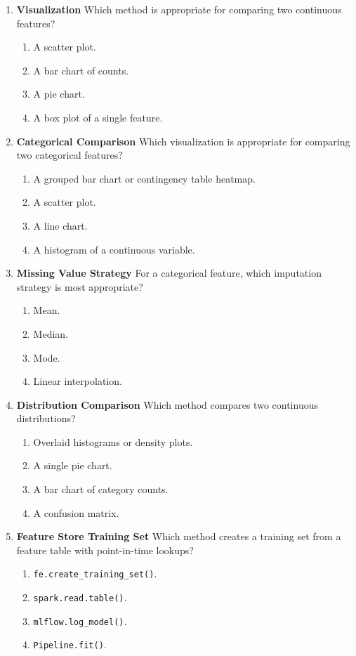 \documentclass{article}
\begin{document}
\begin{enumerate}[label=\textbf{Q\arabic*.}]
		\item \textbf{Visualization}
		Which method is appropriate for comparing two continuous features?
		\begin{enumerate}[label=\Alph*.]
			\item A scatter plot.
			\item A bar chart of counts.
			\item A pie chart.
			\item A box plot of a single feature.
		\end{enumerate}
		
		\item \textbf{Categorical Comparison}
		Which visualization is appropriate for comparing two categorical features?
		\begin{enumerate}[label=\Alph*.]
			\item A grouped bar chart or contingency table heatmap.
			\item A scatter plot.
			\item A line chart.
			\item A histogram of a continuous variable.
		\end{enumerate}
		
		\item \textbf{Missing Value Strategy}
		For a categorical feature, which imputation strategy is most appropriate?
		\begin{enumerate}[label=\Alph*.]
			\item Mean.
			\item Median.
			\item Mode.
			\item Linear interpolation.
		\end{enumerate}
		
		\item \textbf{Distribution Comparison}
		Which method compares two continuous distributions?
		\begin{enumerate}[label=\Alph*.]
			\item Overlaid histograms or density plots.
			\item A single pie chart.
			\item A bar chart of category counts.
			\item A confusion matrix.
		\end{enumerate}
		
		\item \textbf{Feature Store Training Set}
		Which method creates a training set from a feature table with point-in-time lookups?
		\begin{enumerate}[label=\Alph*.]
			\item \texttt{fe.create\_training\_set()}.
			\item \texttt{spark.read.table()}.
			\item \texttt{mlflow.log\_model()}.
			\item \texttt{Pipeline.fit()}.
		\end{enumerate}
		

\end{enumerate}
\end{document}
